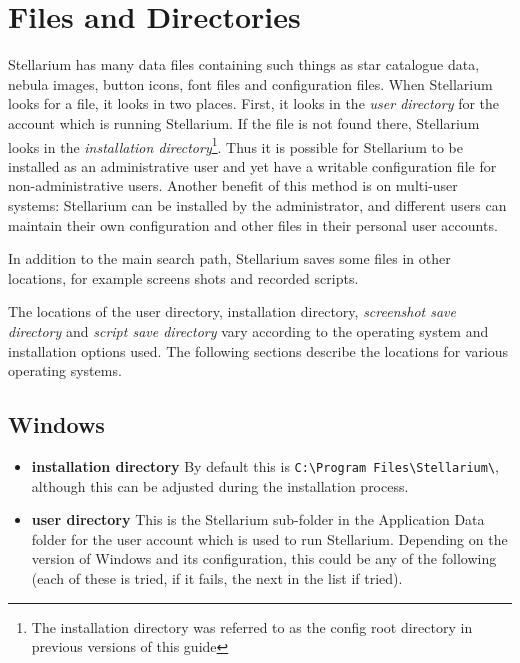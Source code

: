
\chapter{Files and Directories}\label{advanced-use}

Stellarium has many data files containing such things as star catalogue
data, nebula images, button icons, font files and configuration files.
When Stellarium looks for a file, it looks in two places. First, it
looks in the \emph{user directory} for the account which is running
Stellarium. If the file is not found there, Stellarium looks in the
\emph{installation directory}\footnote{The installation directory was
  referred to as the config root directory in previous versions of this
  guide}. Thus it is possible for Stellarium to be installed as an
administrative user and yet have a writable configuration file for
non-administrative users. Another benefit of this method is on
multi-user systems: Stellarium can be installed by the administrator,
and different users can maintain their own configuration and other files
in their personal user accounts.

In addition to the main search path, Stellarium saves some files in
other locations, for example screens shots and recorded scripts.

The locations of the user directory, installation directory,
\emph{screenshot save directory} and \emph{script save directory} vary
according to the operating system and installation options used. The
following sections describe the locations for various operating systems.

\section{Windows}\label{windows}

\begin{itemize}
\item
  \textbf{installation directory} By default this is
  \texttt{C:\textbackslash{}Program\ Files\textbackslash{}Stellarium\textbackslash{}},
  although this can be adjusted during the installation process.
\item
  \textbf{user directory} This is the Stellarium sub-folder in the
  Application Data folder for the user account which is used to run
  Stellarium. Depending on the version of Windows and its configuration,
  this could be any of the following (each of these is tried, if it
  fails, the next in the list if tried).
\end{itemize}

